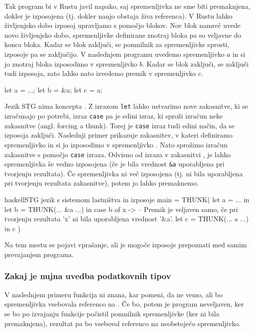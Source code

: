 Tak program bi v Rustu javil napako, saj spremenljivka ne sme biti premaknjena, dokler je izposojena (tj. dokler nanjo obstaja živa referenca). V Rustu lahko življenjsko dobo izposoj upravljamo s pomočjo blokov. Nov blok namreč uvede novo življenjsko dobo, spremenljivke definirane znotraj bloka pa so veljavne do konca bloka. Kadar se blok zaključi, se pomnilnik za spremenljivke sprosti, izposoje pa se zaključijo. V naslednjem programu uvedemo spremenljivko $a$ in si jo znotraj bloka izposodimo v spremenljivko $b$. Kadar se blok zaključi, se zaključi tudi izposoja, zato lahko nato izvedemo premik v spremenljivko $c$.  

\begin{rust-success}
let a = ...;
{
    let b = &a;
}
let c = a;
\end{rust-success}

Jezik STG nima koncepta . Z izrazom \texttt{let} lahko ustvarimo nove zakasnitve, ki se izračunajo po potrebi, izraz \texttt{case} pa je edini izraz, ki sproži izračun neke zakasnitve (angl. forcing a thunk).  Torej je \texttt{case} izraz tudi edini način, da se izposoja zaključi. Naslednji primer prikazuje zakasnitev, v kateri definiramo spremenljivko  in si jo izposodimo v spremenljivko . Nato sprožimo izračun zakasnitve  s pomočjo \texttt{case} izraza. Odvisno od izraza v zakasnitvi , je lahko spremenljivka  še vedno izposojena (če je bila vrednost \texttt{\&a} uporabljena pri tvorjenju rezultata). Če spremenljivka  ni več izposojena (tj. ni bila uporabljena pri tvorjenju rezultata zakasnitve), potem jo lahko premaknemo.

\begin{code-box}{haskell}{STG jezik s sistemom lastništva in izposoje}
main = THUNK(
    let a = ... in
    let b = THUNK(... &a ...) in
    case b of {
        x ->
            -- Premik je veljaven samo, če pri tvorjenju rezultata 'x' ni bila uporabljena vrednost '&a'.
            let c = THUNK(... a ...) in c
    }
)
\end{code-box}

Na tem mestu se pojavi vprašanje, ali je mogoče izposoje prepoznati med samim prevajanjem programa. 

\subsubsection{Zakaj je nujna uvedba podatkovnih tipov}

V naslednjem primeru funkcija  ni znana, kar pomeni, da ne vemo, ali bo spremenljivka  vsebovala referenco na . Če bo, potem je program neveljaven, ker se bo po izvajanju funkcije  počistil pomnilnik spremenljivke  (ker ni bila premaknjena), rezultat pa bo vseboval referenco na neobstoječo spremenljivko.

